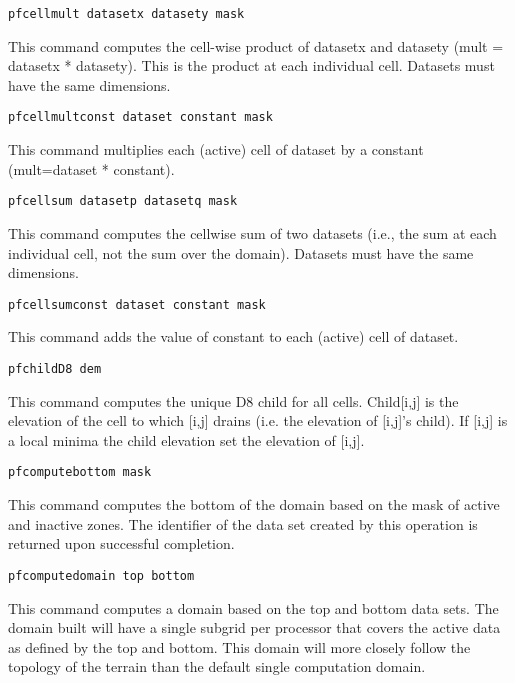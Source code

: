 \begin{description}
\item{\begin{verbatim}pfcellmult datasetx datasety mask\end{verbatim}}
This command computes the cell-wise product of datasetx and datasety (mult = datasetx * datasety).
This is the product at each individual cell. Datasets must have the same dimensions.

\item{\begin{verbatim}pfcellmultconst dataset constant mask\end{verbatim}}
This command multiplies each (active) cell of dataset by a constant (mult=dataset * constant).


\item{\begin{verbatim}pfcellsum datasetp datasetq mask\end{verbatim}}
This command computes the cellwise sum of two datasets (i.e., the sum at each
individual cell, not the sum over the domain). Datasets must have the same
dimensions.


\item{\begin{verbatim}pfcellsumconst dataset constant mask\end{verbatim}}
This command adds the value of constant to each (active) cell of dataset.

\item{\begin{verbatim}pfchildD8 dem\end{verbatim}}
This command computes the unique D8 child for all cells. Child[i,j] is the
elevation of the cell to which [i,j] drains (i.e. the elevation of [i,j]'s
child). If [i,j] is a local minima the child elevation set the elevation of [i,j].

\item{\begin{verbatim}pfcomputebottom mask\end{verbatim}}
This command computes the bottom of the domain based on the mask of active and inactive zones.
The identifier of the data set created by this operation is returned upon successful completion.

\item{\begin{verbatim}pfcomputedomain top bottom\end{verbatim}} This
 command computes a domain based on the top and bottom data sets.  The
 domain built will have a single subgrid per processor that covers the
 active data as defined by the top and bottom.  This domain will more
 closely follow the topology of the terrain than the default single
 computation domain.


\end{description}
